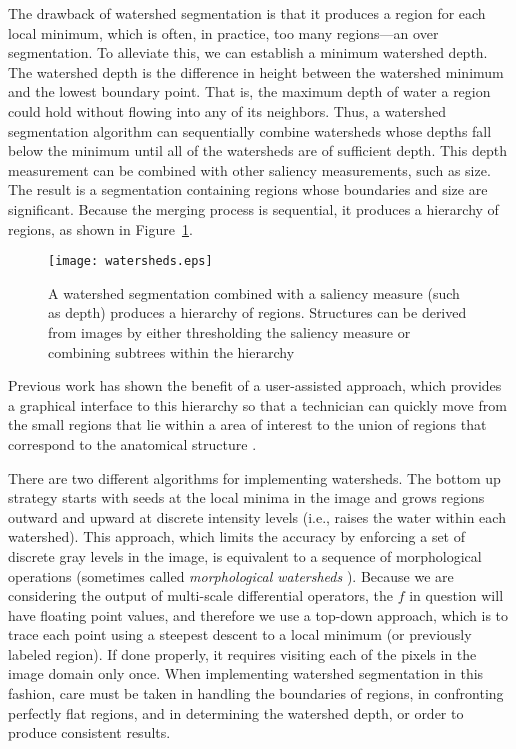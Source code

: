 The drawback of watershed segmentation is that it produces a region for each
local minimum, which is often, in practice, too many regions---an over
segmentation.  To alleviate this, we can establish a minimum watershed depth.
The watershed depth is the difference in height between the watershed minimum
and the lowest boundary point.  That is, the maximum depth of water a region
could hold without flowing into any of its neighbors.  Thus, a watershed
segmentation algorithm can sequentially combine watersheds whose depths fall
below the minimum until all of the watersheds are of sufficient depth.  This
depth measurement can be combined with other saliency measurements, such as
size.  The result is a segmentation containing regions whose boundaries and
size are significant.  Because the merging process is sequential, it produces a
hierarchy of regions, as shown in Figure~\ref{fig:watersheds}.
\begin{figure}
\centering
\texttt{[image: watersheds.eps]}
\caption{A watershed segmentation combined with a saliency measure 
(such as depth) produces a hierarchy of regions.  Structures can be 
derived from images by either thresholding the saliency measure or 
combining subtrees within the hierarchy}
\protect\label{fig:watersheds}
\end{figure}
Previous work has shown the benefit of a user-assisted approach, which provides
a graphical interface to this hierarchy so that a technician can quickly move
from the small regions that lie within a area of interest to the union of
regions that correspond to the anatomical structure \cite{Yoo1991}.

There are two different algorithms for implementing watersheds.  The bottom up
strategy starts with seeds at the local minima in the image and grows regions
outward and upward at discrete intensity levels (i.e., raises the water within
each watershed).  This approach, which limits the accuracy by enforcing a set
of discrete gray levels in the image, is equivalent to a sequence of
morphological operations (sometimes called {\em morphological watersheds}
\cite{Serra1982}).  Because we are considering the output of multi-scale
differential operators, the $f$ in question will have floating point values,
and therefore we use a top-down approach, which is to trace each point using a
steepest descent to a local minimum (or previously labeled region).  If done
properly, it requires visiting each of the pixels in the image domain only
once.  When implementing watershed segmentation in this fashion, care must be
taken in handling the boundaries of regions, in confronting perfectly flat
regions, and in determining the watershed depth, or order to produce consistent
results.

